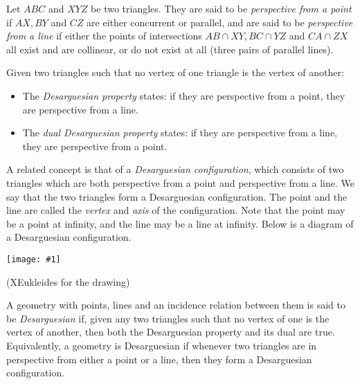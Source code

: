 \documentclass[12pt]{article}
\newcommand{\figuraex}[2]{\begin{center}\texttt{[image: \#1]}\end{center}}
\begin{document}
Let $ABC$ and $XYZ$ be two triangles.  They are said to be \emph{perspective from a point} if $AX,BY$ and $CZ$ are either concurrent or parallel, and are said to be \emph{perspective from a line} if either the points of intersections $AB \cap XY, BC\cap YZ$ and $CA \cap ZX$ all exist and are collinear, or do not exist at all (three pairs of parallel lines).

Given two triangles such that no vertex of one triangle is the vertex of another:
\begin{itemize}
\item The \emph{Desarguesian property} states: if they are perspective from a point, they are perspective from a line.
\item The \emph{dual Desarguesian property} states: if they are perspective from a line, they are perspective from a point.
\end{itemize}

A related concept is that of a \emph{Desarguesian configuration}, which consists of two triangles which are both perspective from a point and perspective from a line.  We say that the two triangles form a Desarguesian configuration.  The point and the line are called the \emph{vertex} and \emph{axis} of the configuration.  Note that the point may be a point at infinity, and the line may be a line at infinity.  Below is a diagram of a Desarguesian configuration.



\figuraex{desargues}{scale=0.75}
{\footnotesize(XEukleides  for the drawing)}

A geometry with points, lines and an incidence relation between them is said to be \emph{Desarguesian} if, given any two triangles such that no vertex of one is the vertex of another, then both the Desarguesian property and its dual are true.  Equivalently, a geometry is Desarguesian if whenever two triangles are in perspective from either a point or a line, then they form a Desarguesian configuration.
\end{document}
